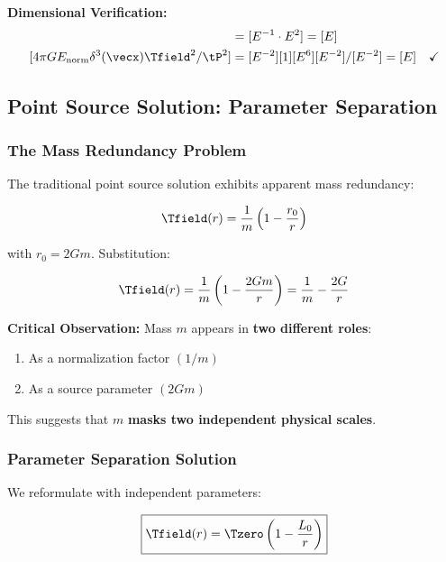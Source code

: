 	\textbf{Dimensional Verification:}
	\begin{align}
		[\nabla^2 \Tfield] &= [E^{-1} \cdot E^2] = [E] \\
		[4\pi G E_{\text{norm}} \delta^3(\vecx) \Tfield^2/\tP^2] &= [E^{-2}][1][E^6][E^{-2}]/[E^{-2}] = [E] \quad \checkmark
	\end{align}
	
	\subsection{Point Source Solution: Parameter Separation}
	\label{subsec:point_source_elimination}
	
	\subsubsection{The Mass Redundancy Problem}
	
	The traditional point source solution exhibits apparent mass redundancy:
	
	\begin{equation}
		\Tfield(r) = \frac{1}{m}\left(1 - \frac{r_0}{r}\right)
		\label{eq:point_source_original}
	\end{equation}
	
	with $r_0 = 2Gm$. Substitution:
	
	\begin{equation}
		\Tfield(r) = \frac{1}{m}\left(1 - \frac{2Gm}{r}\right) = \frac{1}{m} - \frac{2G}{r}
		\label{eq:mass_redundancy}
	\end{equation}
	
	\textbf{Critical Observation:} Mass $m$ appears in \textbf{two different roles}:
	\begin{enumerate}
		\item As a normalization factor $(1/m)$
		\item As a source parameter $(2Gm)$
	\end{enumerate}
	
	This suggests that $m$ \textbf{masks two independent physical scales}.
	
	\subsubsection{Parameter Separation Solution}
	
	We reformulate with independent parameters:
	
	\begin{equation}
		\boxed{\Tfield(r) = \Tzero\left(1 - \frac{L_0}{r}\right)}
		\label{eq:point_source_mass_free}
	\end{equation}
	
